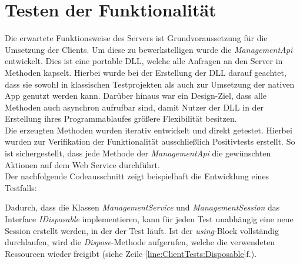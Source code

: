\section{Testen der Funktionalität}
\label{sec:server-tests}
Die erwartete Funktionsweise des Servers ist Grundvoraussetzung für die Umsetzung der Clients. Um diese zu bewerkstelligen wurde die \textit{ManagementApi} entwickelt. Dies ist eine portable \ac{DLL}, welche alle Anfragen an den Server in Methoden kapselt. Hierbei wurde bei der Erstellung der \ac{DLL} darauf geachtet, dass sie sowohl in klassischen Testprojekten als auch zur Umsetzung der nativen \gls{App} genutzt werden kann. Darüber hinaus war ein Design-Ziel, dass alle Methoden auch asynchron aufrufbar sind, damit Nutzer der \ac{DLL} in der Erstellung ihres Programmablaufes größere Flexibilität besitzen. \\
Die erzeugten Methoden wurden iterativ entwickelt und direkt getestet. Hierbei wurden zur Verifikation der Funktionalität ausschließlich Positivtests erstellt. So ist sichergestellt, dass jede Methode der \textit{ManagementApi} die gewünschten Aktionen auf dem Web Service durchführt. \\
Der nachfolgende Codeausschnitt zeigt beispielhaft die Entwicklung eines Testfalls:

Dadurch, dass die Klassen \textit{ManagementService} und \textit{ManagementSession} das Interface \textit{IDisposable} implementieren, kann für jeden Test unabhängig eine neue Session erstellt werden, in der der Test läuft. Ist der \textit{using}-Block vollständig durchlaufen, wird die \textit{Dispose}-Methode aufgerufen, welche die verwendeten Ressourcen wieder freigibt (siehe Zeile \ref{line:ClientTests:Disposable}f.). 